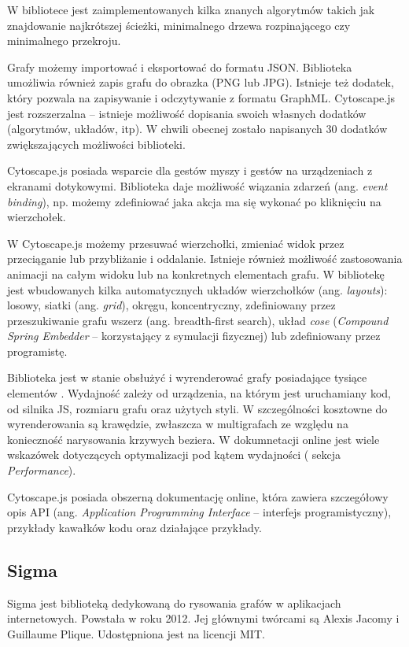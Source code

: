 W bibliotece jest zaimplementowanych kilka znanych algorytmów takich jak znajdowanie najkrótszej ścieżki, minimalnego drzewa rozpinającego czy minimalnego przekroju. 

Grafy możemy importować i eksportować do formatu JSON. Biblioteka umożliwia również zapis grafu do obrazka (PNG lub JPG). Istnieje też dodatek, który pozwala na zapisywanie i odczytywanie z formatu GraphML. Cytoscape.js jest rozszerzalna -- istnieje możliwość dopisania swoich własnych dodatków (algorytmów, układów, itp).  W chwili obecnej zostało napisanych 30 dodatków zwiększających możliwości biblioteki. 

Cytoscape.js posiada wsparcie dla gestów myszy i gestów na urządzeniach z ekranami dotykowymi. Biblioteka daje możliwość wiązania zdarzeń (ang. \textit{event binding}), np. możemy zdefiniować jaka akcja ma się wykonać po kliknięciu na wierzchołek. 

W Cytoscape.js możemy przesuwać wierzchołki, zmieniać widok przez przeciąganie lub przybliżanie i oddalanie. Istnieje również możliwość zastosowania animacji na całym widoku lub na konkretnych elementach grafu. W bibliotekę jest wbudowanych kilka automatycznych układów wierzchołków (ang. \textit{layouts}): losowy, siatki (ang. \textit{grid}), okręgu, koncentryczny, zdefiniowany przez przeszukiwanie grafu wszerz (ang. breadth-first search), układ \textit{cose} (\textit{Compound Spring Embedder} -- korzystający z symulacji fizycznej) lub zdefiniowany przez programistę. 

Biblioteka jest w stanie obsłużyć i wyrenderować grafy posiadające tysiące elementów \cite[310]{franz}. Wydajność zależy od urządzenia, na którym jest uruchamiany kod, od silnika JS, rozmiaru grafu oraz użytych styli. W szczególności kosztowne do wyrenderowania są krawędzie, zwłaszcza w multigrafach ze względu na konieczność narysowania krzywych beziera. W dokumnetacji online jest wiele wskazówek dotyczących optymalizacji pod kątem wydajności (\cite{cytoscape} sekcja \textit{Performance}).

Cytoscape.js posiada obszerną dokumentację online, która zawiera szczegółowy opis API (ang. \textit{Application Programming Interface} -- interfejs programistyczny), przykłady kawałków kodu oraz działające przykłady. 

\subsection{Sigma}

Sigma jest biblioteką dedykowaną do rysowania grafów w aplikacjach internetowych. Powstała w roku 2012. Jej głównymi twórcami są Alexis Jacomy i Guillaume Plique. Udostępniona jest na licencji MIT. 

